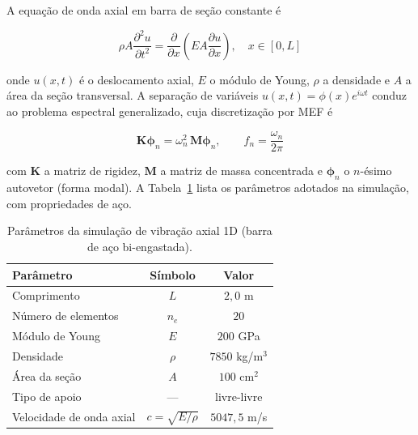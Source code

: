 A equação de onda axial em barra de seção constante é

\begin{equation}
    \rho A \frac{\partial^2 u}{\partial t^2} = \frac{\partial}{\partial x}\!\left( E A \frac{\partial u}{\partial x} \right), \quad x \in [0, L]
    \label{eq:val_vibracao_edp}
\end{equation}

\noindent onde $u(x,t)$ é o deslocamento axial, $E$ o módulo de Young, $\rho$ a densidade e $A$ a área da seção transversal. A separação de variáveis $u(x,t) = \phi(x) e^{i \omega t}$ conduz ao problema espectral generalizado, cuja discretização por MEF é

\begin{equation}
    \mathbf{K} \boldsymbol{\phi}_n = \omega_n^2 \, \mathbf{M} \boldsymbol{\phi}_n, \qquad f_n = \frac{\omega_n}{2\pi}
    \label{eq:val_vibracao_autovalor}
\end{equation}

\noindent com $\mathbf{K}$ a matriz de rigidez, $\mathbf{M}$ a matriz de massa concentrada e $\boldsymbol{\phi}_n$ o $n$-ésimo autovetor (forma modal). A Tabela~\ref{tab:val_vibracao_params} lista os parâmetros adotados na simulação, com propriedades de aço.

\begin{table}[htbp]
    \centering
    \caption{Parâmetros da simulação de vibração axial 1D (barra de aço bi-engastada).}
    \label{tab:val_vibracao_params}
    \begin{tabular}{lcc}
        \hline
        \textbf{Parâmetro} & \textbf{Símbolo} & \textbf{Valor} \\
        \hline
        Comprimento                  & $L$  & $2{,}0$ m          \\
        Número de elementos          & $n_e$ & $20$              \\
        Módulo de Young              & $E$  & $200$ GPa          \\
        Densidade                    & $\rho$ & $7850$ kg/m$^3$  \\
        Área da seção                & $A$  & $100$ cm$^{2}$     \\
        Tipo de apoio                & ---  & livre-livre       \\
        Velocidade de onda axial     & $c = \sqrt{E/\rho}$ & $5047{,}5$ m/s \\
        \hline
    \end{tabular}
\end{table}

